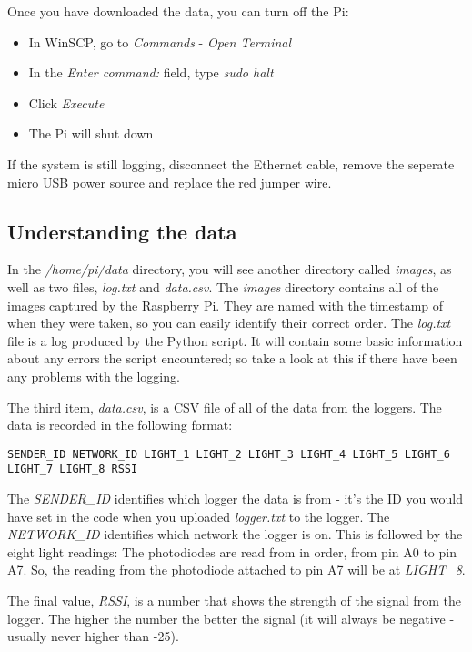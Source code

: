 \documentclass[10pt]{article}
\begin{document}
Once you have downloaded the data, you can turn off the Pi:

\begin{itemize}
 \item In WinSCP, go to \textit{Commands} - \textit{Open Terminal}
 \item In the \textit{Enter command:} field, type \textit{sudo halt}
 \item Click \textit{Execute}
 \item The Pi will shut down
\end{itemize}

If the system is still logging, disconnect the Ethernet cable, remove the seperate micro USB power source and replace the red jumper wire. 

\subsection{Understanding the data}

In the \textit{/home/pi/data} directory, you will see another directory called \textit{images}, as well as two files, \textit{log.txt} and \textit{data.csv}. The \textit{images} directory contains all of the images captured by the Raspberry Pi. They are named with the timestamp of when they were taken, so you can easily identify their correct order. The \textit{log.txt} file is a log produced by the Python script. It will contain some basic information about any errors the script encountered; so take a look at this if there have been any problems with the logging. 

The third item, \textit{data.csv}, is a CSV file of all of the data from the loggers. The data is recorded in the following format: 

\begin{verbatim}
SENDER_ID NETWORK_ID LIGHT_1 LIGHT_2 LIGHT_3 LIGHT_4 LIGHT_5 LIGHT_6 LIGHT_7 LIGHT_8 RSSI
\end{verbatim}

The \textit{SENDER\_ID} identifies which logger the data is from - it's the ID you would have set in the code when you uploaded \textit{logger.txt} to the logger. The \textit{NETWORK\_ID} identifies which network the logger is on. This is followed by the eight light readings: The photodiodes are read from in order, from pin A0 to pin A7. So, the reading from the photodiode attached to pin A7 will be at \textit{LIGHT\_8}. 

The final value, \textit{RSSI}, is a number that shows the strength of the signal from the logger. The higher the number the better the signal (it will always be negative - usually never higher than -25).
\end{document}
